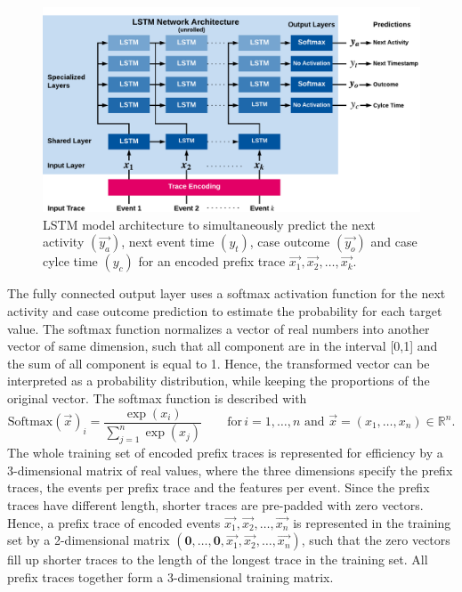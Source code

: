 \begin{figure}[!htbp]
	\centering
	\includegraphics[width=\textwidth]{figures/network}
	\caption[LSTM model architecture for text-aware process prediction]{LSTM model architecture to simultaneously predict the next activity $(\vec{y_a})$, next event time $(y_t)$, case outcome $(\vec{y_o})$ and case cylce time $(y_c)$ for an encoded prefix trace $\vec{x_1}, \vec{x_2}, \dots, \vec{x_k}$.}
	\label{fig:network}
\end{figure}

The fully connected output layer uses a softmax activation function for the next activity and case outcome prediction to estimate the probability for each target value.
The softmax function normalizes a vector of real numbers into another vector of same dimension, such that all component are in the interval [0,1] and the sum of all component is equal to 1.
Hence, the transformed vector can be interpreted as a probability distribution, while keeping the proportions of the original vector.
The softmax function is described with
\begin{equation*}\label{key}
	\text{Softmax}(\vec{x})_i = \frac{\exp(x_i)}{\sum_{j=1}^{n} \exp(x_j)}  \qquad \text{for} \, i = 1, \dots, n \text{ and } \vec{x}=(x_1, \dots, x_n) \in \mathbb{R}^n.
\end{equation*}
The whole training set of encoded prefix traces is represented for efficiency by a 3-dimensional matrix of real values, where the three dimensions specify the prefix traces, the events per prefix trace and the features per event.
Since the prefix traces have different length, shorter traces are pre-padded \cite{DBLP:journals/corr/abs-1903-07288} with zero vectors.
Hence, a prefix trace of encoded events $\vec{x_1}, \vec{x_2}, \dots, \vec{x_n}$  is represented in the training set by a 2-dimensional matrix $(\mathbf{0}, \dots, \mathbf{0},\vec{x_1}, \vec{x_2}, \dots, \vec{x_n})$, such that the zero vectors fill up shorter traces to the length of the longest trace in the training set.
All prefix traces together form a 3-dimensional training matrix.

